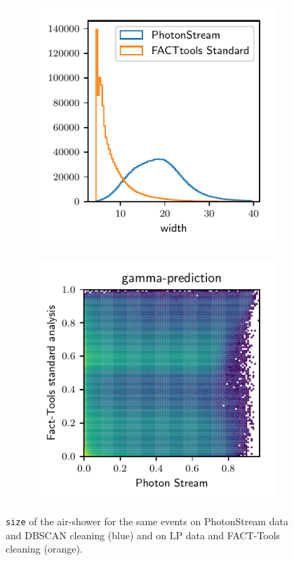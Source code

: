 \begin{figure}
  \begin{subfigure}{0.5\textwidth}
    \centering
  \includegraphics[width=\textwidth, page=5]{Plots/std_phs_comparison_hist_same_DBSCAN_crab.pdf}
  \end{subfigure}
  \begin{subfigure}{0.5\textwidth}
    \centering
    \includegraphics[width=\textwidth, page=5]{Plots/comparison_data_dl3.pdf}
  \end{subfigure}
  \caption{\texttt{size} of the air-shower for the same events on PhotonStream data and DBSCAN cleaning (blue) and on LP data and FACT-Tools cleaning (orange).}
  \label{fig:size_comp}
\end{figure}
